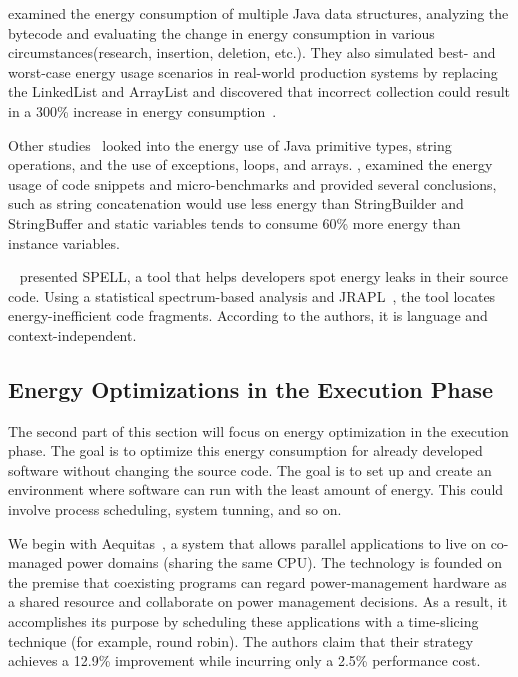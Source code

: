 \citeauthor{hasan_energy_2016} examined the energy consumption of multiple Java data structures, analyzing the bytecode and evaluating the change in energy consumption in various circumstances(research, insertion, deletion, etc.). They also simulated best- and worst-case energy usage scenarios in real-world production systems by replacing the LinkedList and ArrayList and discovered that incorrect collection could result in a 300\% increase in energy consumption~\cite{hasan_energy_2016}.

Other studies~\cite{longo_reducing_2019,kumar_energy_2017} looked into the energy use of Java primitive types, string operations, and the use of exceptions, loops, and arrays. \citeauthor{kumar_energy_2017}, examined the energy usage of code snippets and micro-benchmarks and provided several conclusions, such as string concatenation would use less energy than StringBuilder and StringBuffer and static variables tends to consume 60\% more energy than instance variables.

\citeauthor{pereira_helping_2017}~\cite{pereira_helping_2017} presented SPELL, a tool that helps developers spot energy leaks in their source code. Using a statistical spectrum-based analysis and JRAPL~\cite{guimaraes2016some,liu_data-oriented_2015}, the tool locates energy-inefficient code fragments. According to the authors, it is language and context-independent.

\subsection{Energy Optimizations in the Execution Phase}
The second part of this section will focus on energy optimization in the execution phase. The goal is to optimize this energy consumption for already developed software without changing the source code. The goal is to set up and create an environment where software can run with the least amount of energy. This could involve process scheduling, system tunning, and so on.

We begin with Aequitas~\cite{ribic2016aequitas}, a system that allows parallel applications to live on co-managed power domains (sharing the same CPU). The technology is founded on the premise that coexisting programs can regard power-management hardware as a shared resource and collaborate on power management decisions. As a result, it accomplishes its purpose by scheduling these applications with a time-slicing technique (for example, round robin). The authors claim that their strategy achieves a 12.9\% improvement while incurring only a 2.5\% performance cost.

